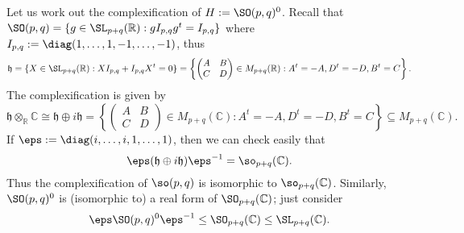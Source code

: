 \documentclass[reqno]{amsart} 
\begin{document}
Let us work out the complexification of $H := \SO(p,q)^0$.
Recall that
$\SO(p,q) = \{g \in \SL_{p+q}(\mathbb{R}) : g I_{p,q} g^t =
I_{p,q}\}$
where
$I_{p,q} := \diag(1,\dotsc,1,-1,\dotsc,-1)$,
thus
\begin{equation*}
  \mathfrak{h} = \{X \in \SL_{p+q}(\mathbb{R}) :
  X I_{p,q} + I_{p,q} X^t = 0 \}
  = \left\{ 
\begin{pmatrix}
      A & B \\
      C & D
    \end{pmatrix}
 \in M_{p+q}(\mathbb{R})
    : A^t = - A, D^t = - D, B^t = C \right\}.
\end{equation*}
The complexification is given by
\begin{equation*}
  \mathfrak{h} \otimes_{\mathbb{R}} \mathbb{C}
  \cong 
  \mathfrak{h}  \oplus i \mathfrak{h}
  =
   \left\{ 
\begin{pmatrix}
      A & B \\
      C & D
    \end{pmatrix}
 \in M_{p+q}(\mathbb{C}) : A^t = - A, D^t = -
    D, B^t= C 
  \right\} \subseteq M_{p+q}(\mathbb{C}).
\end{equation*}
If $\eps := \diag(i,\dotsc,i,1,\dotsc,1)$,
then we can check easily that
\begin{equation*}
  \eps (\mathfrak{h} \oplus i \mathfrak{h}) \eps^{-1}
  =
  \so_{p+q}(\mathbb{C}).
\end{equation*}
Thus the complexification of $\so(p,q)$
is isomorphic to $\so_{p+q}(\mathbb{C})$.
Similarly,
$\SO(p,q)^0$ is (isomorphic to)
a real form of $\SO_{p+q}(\mathbb{C})$;
just consider
\begin{equation*}
  \eps \SO(p,q)^0 \eps^{-1}
  \leq \SO_{p+q}(\mathbb{C}) \leq \SL_{p+q}(\mathbb{C}).
\end{equation*}
\end{document}
